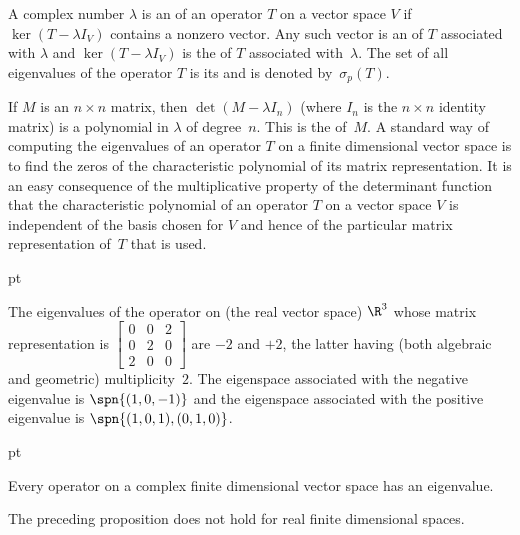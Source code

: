 \begin{defn} A complex number $\lambda$ is an
 of an operator $T$ on a vector space $V$ if $\ker(T - \lambda I_V)$
contains a nonzero vector.  Any such vector is an
 of $T$ associated with $\lambda$ and $\ker(T - \lambda I_V)$ is the
 of $T$ associated with~$\lambda$.  The set of all eigenvalues of the
operator $T$ is its
 and is denoted by~$\sigma_p(T)$.
\end{defn}

If $M$ is an $n \times n$ matrix, then $\det(M - \lambda I_n)$ (where $I_n$ is the $n
\times n$ identity matrix) is a polynomial in $\lambda$ of degree~$n$. This is the
 of~$M$. A standard way of computing the eigenvalues of an
operator $T$ on a finite dimensional vector space is to find the zeros of the
characteristic polynomial of its matrix representation. It is an easy consequence of the
multiplicative property of the determinant function that the characteristic polynomial of
an operator $T$ on a vector space $V$ is independent of the basis chosen for $V$ and
hence of the particular matrix representation of~$T$ that is used.

 pt

\begin{exam} The eigenvalues of the operator on (the real vector space) $\R^3$ whose matrix
representation is  $ \begin{bmatrix} 0  &  0  &  2 \\
                                     0  &  2  &  0 \\
                                     2  &  0  &  0
                      \end{bmatrix}$ are $-2$ and $+2$, the latter having (both algebraic and
geometric) multiplicity~$2$. The eigenspace associated with the negative eigenvalue is
$\spn\{(1,0,-1)\}$ and the eigenspace associated with the positive eigenvalue is
$\spn\{(1,0,1), (0,1,0)\}$.
\end{exam}

 pt

\begin{prop} Every operator on a complex finite dimensional vector space has an eigenvalue.
\end{prop}

\begin{exam} The preceding proposition does not hold for real finite dimensional spaces.
\end{exam}

